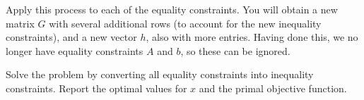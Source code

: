 Apply this process to each of the equality constraints. You will obtain a new matrix $G$ with several additional rows (to account for the new inequality
constraints), and a new vector $h$, also with more entries. Having done this, we no longer have equality constraints $A$ and $b$, so these can be ignored.
\begin{problem}
Solve the problem by converting all equality constraints into inequality constraints.
Report the optimal values for $x$ and the primal objective function.
\end{problem}

\begin{comment}
\section*{Example}

Why are all of the terms in $G$ and $h$ non-positive?

\begin{lstlisting}
>>> from cvxopt import matrix, solvers
>>> G = matrix([ [-1., 0., 0., -1., 0.,  -1., 0., 0., 0., 0., 0.],
             [-1., 0., 0., 0., -1.,  0., -1., 0., 0., 0., 0.],
             [0., -1., 0., -1., 0.,  0., 0., -1., 0., 0., 0.],
             [0., -1., 0., 0., -1.,  0., 0., 0., -1., 0., 0.],
             [0., 0., -1., -1., 0.,  0., 0., 0., 0., -1., 0.],
             [0., 0., -1., 0., -1.,  0., 0., 0., 0., 0., -1.] ])

>>> h = matrix([-7., -2., -4., -5., -8.,  0., 0., 0., 0., 0., 0.,])
>>> c = matrix([4., 7., 6., 8., 8., 9])
>>> sol = solvers.lp(c,G,h)
>>> print sol['x']
>>> print sol['primal objective']
\end{lstlisting}

Another method is to use an integer linear program.
Cvxopt is configured to work with  Gnu, which does have an integer linear program.
It will work with either of the methods above.

\textbf{Example}

glpk.ilp returns a tuple.
The first entry describes the optimality of the result, while the second gives the $x$ values.

\begin{lstlisting}
>>> from cvxopt import matrix, solvers, glpk
>>> G = matrix([ [-1., 0., 0., -1., 0.,  -1., 0., 0., 0., 0., 0.],
             [-1., 0., 0., 0., -1.,  0., -1., 0., 0., 0., 0.],
             [0., -1., 0., -1., 0.,  0., 0., -1., 0., 0., 0.],
             [0., -1., 0., 0., -1.,  0., 0., 0., -1., 0., 0.],
             [0., 0., -1., -1., 0.,  0., 0., 0., 0., -1., 0.],
             [0., 0., -1., 0., -1.,  0., 0., 0., 0., 0., -1.] ])


\end{comment}
